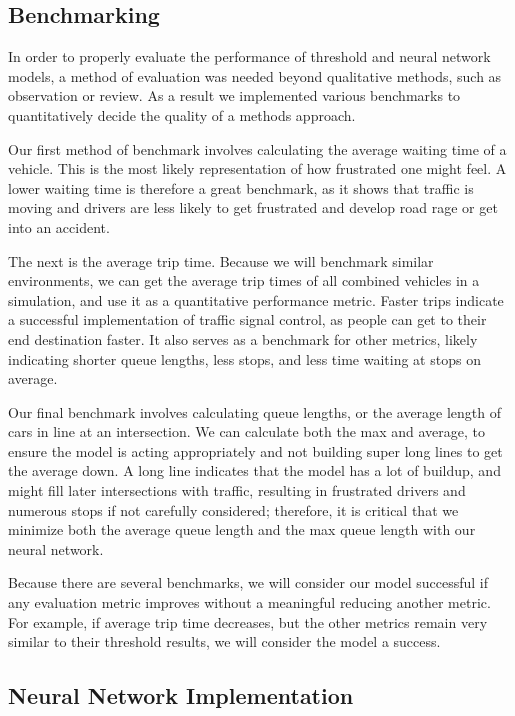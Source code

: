 \documentclass[conference]{IEEEtran}
\begin{document}
\subsection{Benchmarking}

In order to properly evaluate the performance of threshold and neural network models, a method of evaluation was needed beyond qualitative methods, such as observation or review. As a result we implemented various benchmarks to quantitatively decide the quality of a methods approach. 

Our first method of benchmark involves calculating the average waiting time of a vehicle. This is the most likely representation of how frustrated one might feel. A lower waiting time is therefore a great benchmark, as it shows that traffic is moving and drivers are less likely to get frustrated and develop road rage or get into an accident. 

The next is the average trip time. Because we will benchmark similar environments, we can get the average trip times of all combined vehicles in a simulation, and use it as a quantitative performance metric. Faster trips indicate a successful implementation of traffic signal control, as people can get to their end destination faster. It also serves as a benchmark for other metrics, likely indicating shorter queue lengths, less stops, and less time waiting at stops on average. 

Our final benchmark involves calculating queue lengths, or the average length of cars in line at an intersection. We can calculate both the max and average, to ensure the model is acting appropriately and not building super long lines to get the average down. A long line indicates that the model has a lot of buildup, and might fill later intersections with traffic, resulting in frustrated drivers and numerous stops if not carefully considered; therefore, it is critical that we minimize both the average queue length and the max queue length with our neural network. 

Because there are several benchmarks, we will consider our model successful if any evaluation metric improves without a meaningful reducing another metric. For example, if average trip time decreases, but the other metrics remain very similar to their threshold results, we will consider the model a success.

\subsection{Neural Network Implementation}
\end{document}
